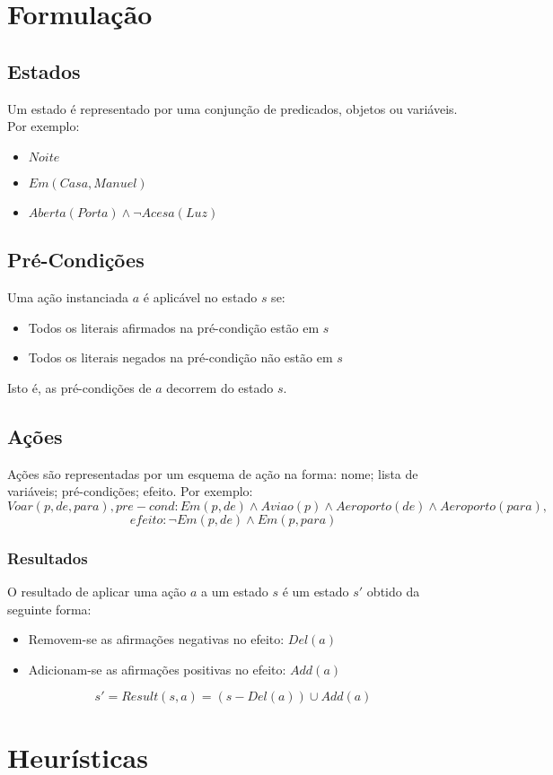 \documentclass[10pt,a4paper]{report}
\begin{document}
\section{Formulação}
\subsection{Estados}
Um estado é representado por uma conjunção de predicados, objetos ou variáveis. Por exemplo:
\begin{itemize}
\item $Noite$
\item $Em(Casa,Manuel)$
\item $Aberta(Porta) \land \lnot Acesa(Luz)$
\end{itemize}
\subsection{Pré-Condições}
Uma ação instanciada $a$ é aplicável no estado $s$ se:
\begin{itemize}
\item Todos os literais afirmados na pré-condição estão em $s$
\item Todos os literais negados na pré-condição não estão em $s$
\end{itemize}
Isto é, as pré-condições de $a$ decorrem do estado $s$.
\subsection{Ações}
Ações são representadas por um esquema de ação na forma: nome; lista de variáveis; pré-condições; efeito. Por exemplo:
$$
Voar(p,de,para), pre-cond: Em(p,de) \land Aviao(p) \land Aeroporto(de) \land Aeroporto(para),
$$
$$
efeito: \lnot Em(p,de) \land Em(p,para)
$$
\subsubsection{Resultados}
O resultado de aplicar uma ação $a$ a um estado $s$ é um estado $s'$ obtido da seguinte forma:
\begin{itemize}
\item Removem-se as afirmações negativas no efeito: $Del(a)$
\item Adicionam-se as afirmações positivas no efeito: $Add(a)$
\end{itemize}
$$
s' = Result(s,a) = (s - Del(a)) \cup Add(a)
$$
\section{Heurísticas}
\end{document}
